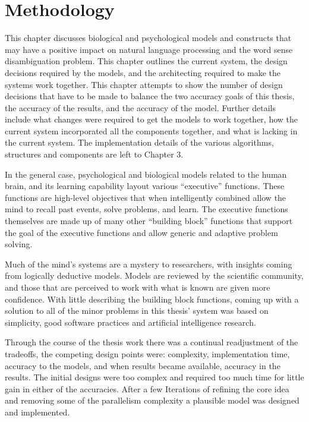 \chapter{Methodology}

This chapter discusses biological and psychological models and constructs that
may have a positive impact on natural language processing and the word sense
disambiguation problem.  This chapter outlines the current system, the design
decisions required by the models, and the architecting required to make the
systems work together.  This chapter attempts to show the number of design
decisions that have to be made to balance the two accuracy goals of this thesis,
the accuracy of the results, and the accuracy of the model. Further details
include what changes were required to get the models to work together, how the
current system incorporated all the components together, and what is lacking in
the current system.  The implementation details of the various algorithms,
structures and components are left to Chapter 3.

In the general case, psychological and biological models related to the human
brain, and its learning capability layout various ``executive'' functions.
These functions are high-level objectives that when intelligently combined allow
the mind to recall past events, solve problems, and learn. The executive
functions themselves are made up of many other ``building block'' functions that
support the goal of the executive functions and allow generic and adaptive
problem solving.

Much of the mind's systems are a mystery to researchers, with insights coming
from logically deductive models.  Models are reviewed by the scientific
community, and those that are perceived to work with what is known are given
more confidence.  With little describing the building block functions, coming up
with a solution to all of the minor problems in this thesis' system was based on
simplicity, good software practices and artificial intelligence research.

Through the course of the thesis work there was a continual readjustment of the
tradeoffs, the competing design points were: complexity, implementation time,
accuracy to the models, and when results became available, accuracy in the
results.  The initial designs were too complex and required too much time for
little gain in either of the accuracies.  After a few Iterations of refining the
core idea and removing some of the parallelism complexity a plausible model was
designed and implemented.

